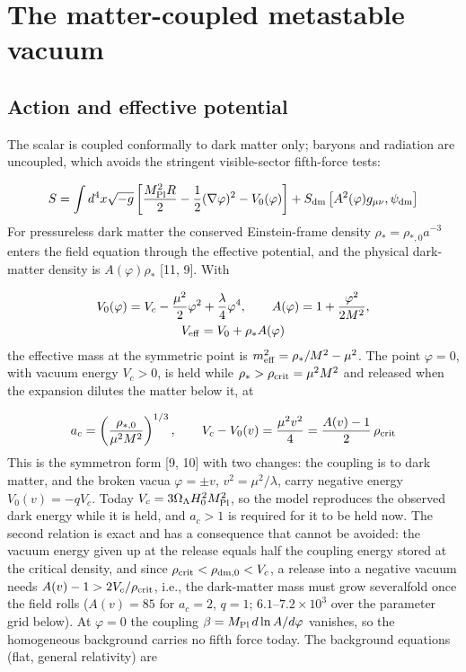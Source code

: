 \documentclass[pdflatex,sn-mathphys-num]{sn-jnl}
\begin{document}
\section{The matter-coupled metastable vacuum}
\subsection{Action and effective potential}
The scalar is coupled conformally to dark matter only; baryons and radiation are uncoupled, which avoids the stringent visible-sector fifth-force tests:

\begin{equation}
S=\int d^4x\sqrt{-g}\left[\frac{M_{\rm Pl}^2R}{2}-\frac{1}{2}(\nabla\varphi)^2-V_0(\varphi)\right]+S_{\rm dm}\left[A^2(\varphi)g_{\mu\nu},\psi_{\rm dm}\right]
\end{equation}
For pressureless dark matter the conserved Einstein-frame density $\rho_*=\rho_{*,0}a^{-3}$ enters the field equation through the effective potential, and the physical dark-matter density is $A(\varphi)\rho_*$ [11, 9]. With

\begin{equation}\begin{gathered}
V_0(\varphi)=V_c-\frac{\mu^2}{2}\varphi^2+\frac{\lambda}{4}\varphi^4,\qquad A(\varphi)=1+\frac{\varphi^2}{2M^2},\\
V_{\rm eff}=V_0+\rho_*A(\varphi)
\end{gathered}\end{equation}
the effective mass at the symmetric point is $m_{\rm eff}^2=\rho_*/M^2-\mu^2$. The point $\varphi=0$, with vacuum energy $V_c>0$, is held while $\rho_*>\rho_{\rm crit}=\mu^2M^2$ and released when the expansion dilutes the matter below it, at

\begin{equation}
a_c=\left(\frac{\rho_{*,0}}{\mu^2M^2}\right)^{1/3},\qquad V_c-V_0(v)=\frac{\mu^2v^2}{4}=\frac{A(v)-1}{2}\,\rho_{\rm crit}
\end{equation}
This is the symmetron form [9, 10] with two changes: the coupling is to dark matter, and the broken vacua $\varphi=\pm v$, $v^2=\mu^2/\lambda$, carry negative energy $V_0(v)=-qV_c$. Today $V_c=3\Omega_\Lambda H_0^2M_{\rm Pl}^2$, so the model reproduces the observed dark energy while it is held, and $a_c>1$ is required for it to be held now. The second relation is exact and has a consequence that cannot be avoided: the vacuum energy given up at the release equals half the coupling energy stored at the critical density, and since $\rho_{\rm crit}<\rho_{\rm dm,0}<V_c$, a release into a negative vacuum needs $A(v)-1>2V_c/\rho_{\rm crit}$, i.e., the dark-matter mass must grow severalfold once the field rolls ($A(v)=85$ for $a_c=2$, $q=1$; $6.1$--$7.2\times10^{3}$ over the parameter grid below). At $\varphi=0$ the coupling $\beta=M_{\rm Pl}\,d\ln A/d\varphi$ vanishes, so the homogeneous background carries no fifth force today. The background equations (flat, general relativity) are
\end{document}
